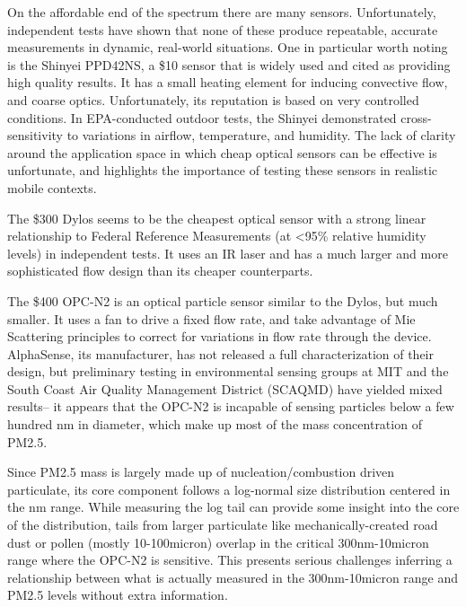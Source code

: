 On the affordable end of the spectrum there are many sensors.  Unfortunately, independent tests have shown that none of these produce repeatable, accurate measurements in dynamic, real-world situations. \cite{williams2014} One in particular worth noting is the Shinyei PPD42NS, a \$10 sensor that is widely used and cited as providing high quality results. \cite{prabakar2015, austin2015} It has a small heating element for inducing convective flow, and coarse optics.  Unfortunately, its reputation is based on very controlled conditions.  In EPA-conducted outdoor tests, the Shinyei demonstrated cross-sensitivity to variations in airflow, temperature, and humidity. \cite{epa2014}  The lack of clarity around the application space in which cheap optical sensors can be effective is unfortunate, and highlights the importance of testing these sensors in realistic mobile contexts.

The \$300 Dylos seems to be the cheapest optical sensor with a strong linear relationship to Federal Reference Measurements (at <95\% relative humidity levels) in independent tests. \cite{williams2014} It uses an IR laser and has a much larger and more sophisticated flow design than its cheaper counterparts. \cite{compact2011}

The \$400 OPC-N2 is an optical particle sensor similar to the Dylos, but much smaller.  It uses a fan to drive a fixed flow rate, and take advantage of Mie Scattering principles to correct for variations in flow rate through the device.  AlphaSense, its manufacturer, has not released a full characterization of their design, but preliminary testing in environmental sensing groups at MIT and the South Coast Air Quality Management District (SCAQMD) have yielded mixed results-- it appears that the OPC-N2 is incapable of sensing particles below a few hundred nm in diameter, which make up most of the mass concentration of PM2.5.  \cite{personal2015, scaqmd2015}

Since PM2.5 mass is largely made up of nucleation/combustion driven particulate, its core component follows a log-normal size distribution centered in the nm range.  While measuring the log tail can provide some insight into the core of the distribution, tails from larger particulate like mechanically-created road dust or pollen (mostly 10-100micron) overlap in the critical 300nm-10micron range where the OPC-N2 is sensitive.  This presents serious challenges inferring a relationship between what is actually measured in the 300nm-10micron range and PM2.5 levels without extra information.  

